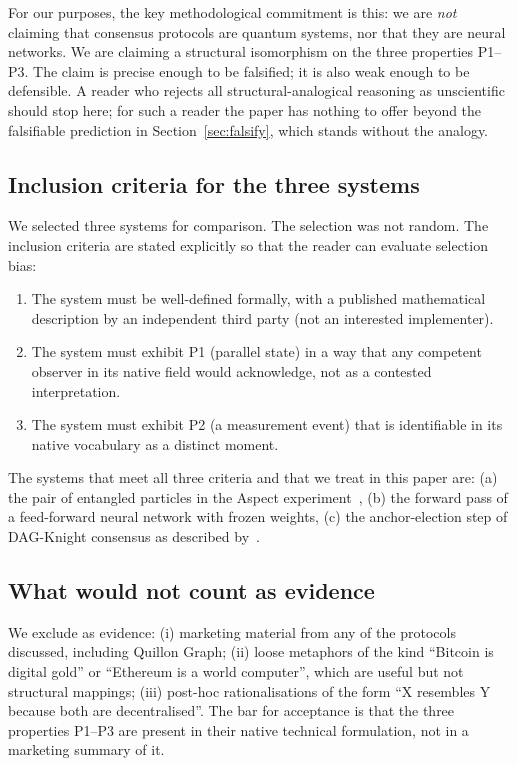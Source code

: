 \documentclass[11pt,a4paper]{article}
\begin{document}
For our purposes, the key methodological commitment is this: we are
\emph{not} claiming that consensus protocols are quantum systems, nor
that they are neural networks. We are claiming a structural isomorphism on
the three properties P1--P3. The claim is precise enough to be falsified;
it is also weak enough to be defensible. A reader who rejects all
structural-analogical reasoning as unscientific should stop here; for
such a reader the paper has nothing to offer beyond the falsifiable
prediction in Section~\ref{sec:falsify}, which stands without the analogy.

\subsection{Inclusion criteria for the three systems}

We selected three systems for comparison. The selection was not random.
The inclusion criteria are stated explicitly so that the reader can
evaluate selection bias:
\begin{enumerate}[label=(\arabic*),leftmargin=2.2em]
  \item The system must be well-defined formally, with a published
  mathematical description by an independent third party (not an
  interested implementer).
  \item The system must exhibit P1 (parallel state) in a way that any
  competent observer in its native field would acknowledge, not as a
  contested interpretation.
  \item The system must exhibit P2 (a measurement event) that is identifiable
  in its native vocabulary as a distinct moment.
\end{enumerate}
The systems that meet all three criteria and that we treat in this paper
are: (a) the pair of entangled particles in the Aspect
experiment~\cite{aspect1982}, (b) the forward pass of a feed-forward neural
network with frozen weights, (c) the anchor-election step of DAG-Knight
consensus as described by~\cite{keidar2022dag}.

\subsection{What would not count as evidence}

We exclude as evidence: (i) marketing material from any of the protocols
discussed, including Quillon Graph; (ii) loose metaphors of the kind
``Bitcoin is digital gold'' or ``Ethereum is a world computer'', which are
useful but not structural mappings; (iii) post-hoc rationalisations of
the form ``X resembles Y because both are decentralised''. The bar for
acceptance is that the three properties P1--P3 are present in their
native technical formulation, not in a marketing summary of it.
\end{document}

